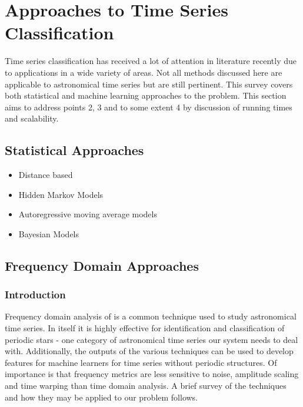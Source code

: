 \documentclass[11pt]{article}
\begin{document}
	\section{Approaches to Time Series Classification}
	Time series classification has received a lot of attention in literature recently due to applications in a wide variety of areas. Not all methods discussed here are applicable to astronomical time series but are still pertinent. This survey covers both statistical and machine learning approaches to the problem. This section aims to address points 2, 3 and to some extent 4 by discussion of running times and scalability.

	\subsection{Statistical Approaches}
	\begin{itemize}
		\item Distance based
		\item Hidden Markov Models
		\item Autoregressive moving average models
		\item Bayesian Models
	\end{itemize}
	\subsection{Frequency Domain Approaches}
	\subsubsection{Introduction}
	Frequency domain analysis of is a common technique used to study astronomical time series. In itself it is highly effective for identification and classification of periodic stars - one category of astronomical time series our system needs to deal with. Additionally, the outputs of the various techniques can be used to develop features for machine learners for time series without periodic structures. Of importance is that frequency metrics are less sensitive to noise, amplitude scaling and time warping than time domain analysis. A brief survey of the techniques and how they may be applied to our problem follows.
\end{document}
